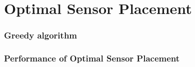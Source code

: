 \chapter{Optimal Sensor Placement}





\subsection{Greedy algorithm}







\subsection{Performance of Optimal Sensor Placement}







